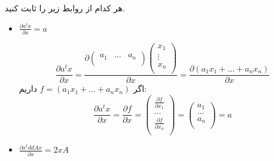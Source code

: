 
هر کدام از روابط زیر را ثابت کنید.
\begin{itemize}
	\item 
	$\frac{\partial a^tx}{\partial x} = a$
	
	$$
	\frac{\partial a^tx}{\partial x} = 
	\frac{\partial \begin{pmatrix}
		a_1 & \dots & a_n \\
		\end{pmatrix}
		\begin{pmatrix}
		x_1 \\
		\vdots \\
		x_n \\
		\end{pmatrix}}{\partial x}
	= \frac{\partial (a_1x_1 + \dots + a_nx_n)}{\partial x}
	$$
	اگر $f = (a_1x_1 + \dots + a_nx_n)$ داریم:
	$$
	\frac{\partial a^tx}{\partial x} = 	\frac{\partial f}{\partial x} = 
	\begin{pmatrix}
		\frac{\partial f}{\partial x_1} \\
		 \dots \\ \frac{\partial f}{\partial x_n}\\
	\end{pmatrix} =
	\begin{pmatrix}
	a_1 \\
	\dots \\
	 a_n \\
	\end{pmatrix}
	= a
	$$
	\item 
	$\frac{\partial x^tddAx}{\partial x} = 2xA$
\end{itemize}